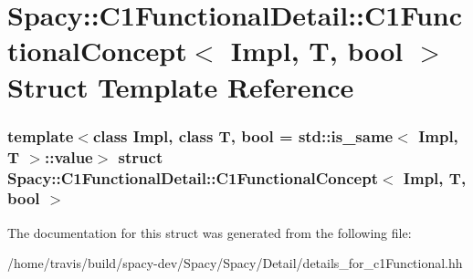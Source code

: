 \hypertarget{structSpacy_1_1C1FunctionalDetail_1_1C1FunctionalConcept}{\section{\-Spacy\-:\-:\-C1\-Functional\-Detail\-:\-:\-C1\-Functional\-Concept$<$ \-Impl, \-T, bool $>$ \-Struct \-Template \-Reference}
\label{structSpacy_1_1C1FunctionalDetail_1_1C1FunctionalConcept}
}
\subsubsection*{template$<$class Impl, class T, bool = std\-::is\-\_\-same$<$ Impl, T $>$\-::value$>$ struct Spacy\-::\-C1\-Functional\-Detail\-::\-C1\-Functional\-Concept$<$ Impl, T, bool $>$}



\-The documentation for this struct was generated from the following file\-:\begin{DoxyCompactItemize}
\item 
/home/travis/build/spacy-\/dev/\-Spacy/\-Spacy/\-Detail/details\-\_\-for\-\_\-c1\-Functional.\-hh\end{DoxyCompactItemize}
